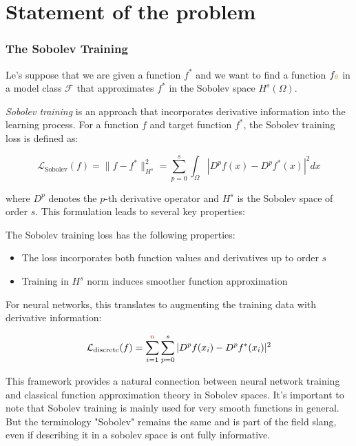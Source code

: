 \documentclass[a4paper]{article}
\theoremstyle{plain}
\theoremstyle{definition}
\theoremstyle{remark}
\begin{document}
\section{Statement of the problem}

\subsubsection{The Sobolev Training}

Le's suppose that we are given a function $f^*$ and we want to find a function $f_{\textcolor{darkyellow}{\theta}}$ in a model class $\mathcal{F}$ that approximates $f^*$ in the Sobolev space $H^s(\Omega)$.

\textit{Sobolev training} \cite{czarnecki2017sobolev,gupte2022sobolev_loss} 
is an approach that incorporates derivative information into the learning process. 
For a function $f$ and target function $f^*$, the Sobolev training loss is defined as:

\begin{tcolorbox}[colback=sobolevcolor!5,colframe=sobolevcolor!60!black,title=Sobolev Training Loss]
\begin{equation}
\label{eq:sobolev_loss}
\mathcal{L}_{\text{Sobolev}}(f) = \|f - f^*\|_{H^s}^2 = \sum_{p=0}^s \int_{\Omega} |D^p f(x) - D^p f^*(x)|^2 dx
\end{equation}
\end{tcolorbox}

where $D^p$ denotes the $p$-th derivative operator and $H^s$ is the Sobolev space of order $s$. This formulation leads to several key properties:

The Sobolev training loss has the following properties:
\begin{itemize}
    \item The loss incorporates both function values and derivatives up to order $s$
    \item Training in $H^s$ norm induces smoother function approximation
\end{itemize}

For neural networks, this translates to augmenting the training data with derivative information:

$$\mathcal{L}_{\text{discrete}}(f) = \sum_{i=1}^{\textcolor{red}{n}} \sum_{p=0}^s |D^p f(x_i) - D^p f^*(x_i)|^2$$

This framework provides a natural connection between neural network training and classical function approximation theory in Sobolev spaces.
It's important to note that Sobolev training is mainly used for very smooth functions in general. But the terminology "Sobolev" remains the same
and is part of the field slang, even if describing it in a sobolev space is ont fully informative.
\end{document}
